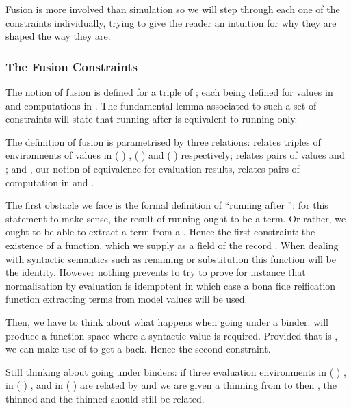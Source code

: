 Fusion is more involved than simulation so we will step through
each one of the constraints individually, trying to give the reader an intuition
for why they are shaped the way they are.

\subsubsection{The Fusion Constraints}

The notion of fusion is defined for a triple of ; each 
being defined for values in  and computations in . The
fundamental lemma associated to such a set of constraints will state that
running  after  is equivalent to running  only.

The definition of fusion is parametrised by three relations:  relates
triples of environments of values in {( )  },
{( )  } and {( )  }
respectively;  relates pairs of values  and ;
and , our notion of equivalence for evaluation results, relates pairs
of computation in  and .


The first obstacle we face is the formal definition of ``running 
after '': for this statement to make sense, the result of running
 ought to be a term. Or rather, we ought to be able to extract a
term from a . Hence the first constraint: the existence of a 
function, which we supply as a field of the record . When dealing with
syntactic semantics such as renaming or substitution
this function will be the identity. However nothing prevents to try to prove for
instance that normalisation by evaluation is idempotent in which case a bona fide
reification function extracting terms from model values will be used.


Then, we have to think about what happens when going under a binder: 
will produce a  function space where a syntactic
value is required. Provided that  is , we can make use of 
to get a  back. Hence the second constraint.


Still thinking about going under binders: if three evaluation environments
 in {( )  },  in
{( )  }, and  in {( )  }
are related by  and we are given a thinning  from  to 
then , the thinned  and the thinned  should still be related.

